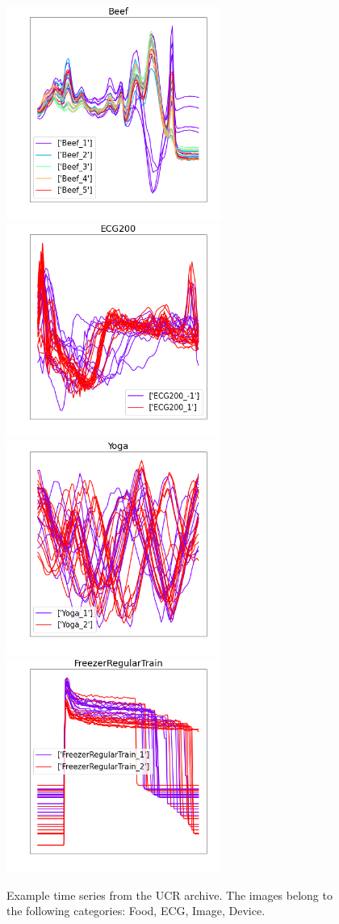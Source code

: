 \documentclass[a4paper,11pt,twoside]{report}
\theoremstyle{definition}
\begin{document}
\begin{figure}[h!]
\centering
\includegraphics[height=7cm]{imgs/UCR_Beef.png}
\includegraphics[height=7cm]{imgs/UCR_ECG200.png}
\includegraphics[height=7cm]{imgs/UCR_Yoga.png}
\includegraphics[height=7cm]{imgs/UCR_FreezerRegularTrain.png}
\caption{Example time series from the UCR archive. The images belong to the following categories: Food, ECG, Image, Device.}
\label{fig:UCR_samples}
\end{figure}
\end{document}

